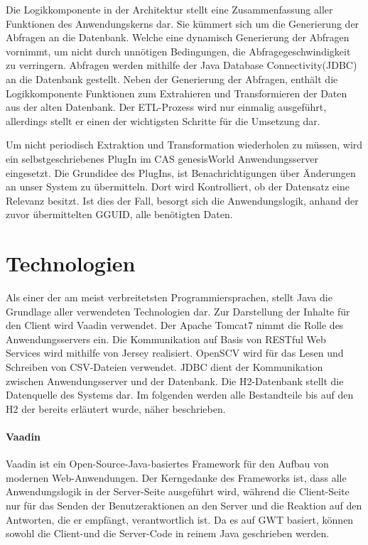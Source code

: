 Die Logikkomponente in der Architektur stellt eine Zusammenfassung aller Funktionen des Anwendungskerns dar. Sie kümmert sich um die Generierung der Abfragen an die Datenbank. Welche eine dynamisch Generierung der Abfragen vornimmt, um nicht durch unnötigen Bedingungen, die Abfragegeschwindigkeit zu verringern. Abfragen werden mithilfe der Java Database Connectivity(JDBC) an die Datenbank gestellt. Neben der Generierung der Abfragen, enthält die Logikkomponente Funktionen zum Extrahieren und Transformieren der Daten aus der alten Datenbank. Der ETL-Prozess wird nur einmalig ausgeführt, allerdings stellt er einen der wichtigsten Schritte für die Umsetzung dar. 

Um nicht periodisch Extraktion und Transformation wiederholen zu müssen, wird ein selbstgeschriebenes PlugIn im CAS genesisWorld Anwendungsserver eingesetzt. Die Grundidee des PlugIns, ist Benachrichtigungen über Änderungen an unser System zu übermitteln. Dort wird Kontrolliert, ob der Datensatz eine Relevanz besitzt. Ist dies der Fall, besorgt sich die Anwendungslogik, anhand der zuvor übermittelten GGUID, alle benötigten Daten.

\section{Technologien}

Als einer der am meist verbreitetsten Programmiersprachen, stellt Java die Grundlage aller verwendeten Technologien dar. Zur Darstellung der Inhalte für den Client wird Vaadin verwendet. Der Apache Tomcat7 nimmt die Rolle des Anwendungsservers ein. Die Kommunikation auf Basis von RESTful Web Services wird mithilfe von Jersey realisiert. OpenSCV wird für das Lesen und Schreiben von CSV-Dateien verwendet. JDBC dient der Kommunikation zwischen Anwendungsserver und der Datenbank. Die H2-Datenbank stellt die Datenquelle des Systems dar. Im folgenden werden alle Bestandteile bis auf den H2 der bereits erläutert wurde, näher beschrieben. 

\paragraph{Vaadin}

Vaadin ist ein Open-Source-Java-basiertes Framework für den Aufbau von modernen Web-Anwendungen. Der Kerngedanke des Frameworks ist, dass alle Anwendungslogik in der Server-Seite ausgeführt wird, während die Client-Seite nur für das Senden der Benutzeraktionen an den Server und die Reaktion auf den Antworten, die er empfängt, verantwortlich ist. Da es auf GWT basiert, können sowohl die Client-und die Server-Code in reinem Java geschrieben werden.

